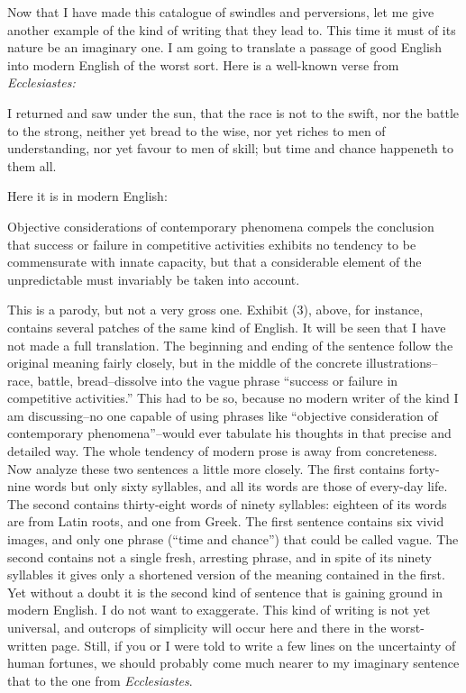 \documentclass[a4paper]{article}
\begin{document}
\vspace{0.3cm}

Now that I have made this catalogue of swindles and perversions, let me give another example of the kind of writing that they lead to. This time it must of its nature be an imaginary one. I am going to translate a passage of good English into modern English of the worst sort. Here is a well-known verse from \textit{Ecclesiastes:}

\vspace{0.2cm}

\small{I returned and saw under the sun, that the race is not to the swift, nor the battle to the strong, neither yet bread to the wise, nor yet riches to men of understanding, nor yet favour to men of skill; but time and chance happeneth to them all.}
\normalsize

\vspace{0.2cm}

Here it is in modern English: 

\vspace{0.2cm}

\small{Objective considerations of contemporary phenomena compels the conclusion that success or failure in competitive activities exhibits no tendency to be commensurate with innate capacity, but that a considerable element of the unpredictable must invariably be taken into account.}
\normalsize

\vspace{0.2cm}

This is a parody, but not a very gross one. Exhibit (3), above, for instance, contains several patches of the same kind of English. It will be seen that I have not made a full translation. The beginning and ending of the sentence follow the original meaning fairly closely, but in the middle of the concrete illustrations--race, battle, bread--dissolve into the vague phrase ``success or failure in competitive activities.'' This had to be so, because no modern writer of the kind I am discussing--no one capable of using phrases like ``objective consideration of contemporary phenomena''--would ever tabulate his thoughts in that precise and detailed way. The whole tendency of modern prose is away from concreteness. Now analyze these two sentences a little more closely. The first contains forty-nine words but only sixty syllables, and all its words are those of every-day life. The second contains thirty-eight words of ninety syllables: eighteen of its words are from Latin roots, and one from Greek. The first sentence contains six vivid images, and only one phrase (``time and chance'') that could be called vague. The second contains not a single fresh, arresting phrase, and in spite of its ninety syllables it gives only a shortened version of the meaning contained in the first. Yet without a doubt it is the second kind of sentence that is gaining ground in modern English. I do not want to exaggerate. This kind of writing is not yet universal, and outcrops of simplicity will occur here and there in the worst-written page. Still, if you or I were told to write a few lines on the uncertainty of human fortunes, we should probably come much nearer to my imaginary sentence that to the one from \textit{Ecclesiastes}.
\end{document}
